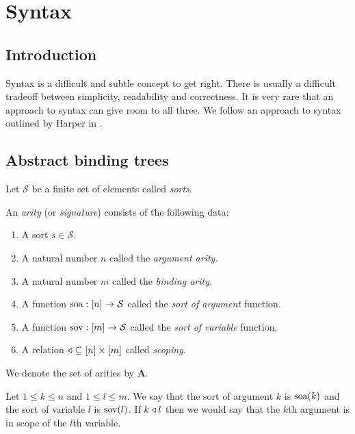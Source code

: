 \section{Syntax}

\subsection{Introduction}

Syntax is a difficult and subtle concept to get right. There is usually a difficult tradeoff between simplicity, readability and correctness. It is very rare that an approach to syntax can give room to all three. We follow an approach to syntax outlined by Harper in \cite{harper_2016}. 

\subsection{Abstract binding trees}

\begin{defin}[Sorts]
    Let $\mathcal{S}$ be a finite set of elements called \emph{sorts}.
\end{defin}

\begin{defin}[Arity]
    An \emph{arity} (or \emph{signature}) consists of the following data:
    \begin{enumerate}
        \setlength{\itemsep}{0pt}
        \item A sort $s \in \mathcal{S}$.
        \item A natural number $n$ called the \emph{argument arity}.
        \item A natural number $m$ called the \emph{binding arity}.
        \item A function $\text{soa} : [n] \to \mathcal{S}$ called the \emph{sort of argument} function.
        \item A function $\text{sov} : [m] \to \mathcal{S}$ called the \emph{sort of variable} function.
        \item A relation $\triangleleft \subseteq [n] \times [m]$ called \emph{scoping}.
    \end{enumerate}
    We denote the set of arities by $\mathbf{A}$.
\end{defin}

\begin{remark}
    Let $1 \le k \le n$ and $1 \le l \le m$. We say that the sort of argument $k$ is $\text{soa}(k)$ and the sort of variable $l$ is $\text{sov}(l)$. If $k \triangleleft l$ then we would say that the $k$th argument is in scope of the $l$th variable.
\end{remark}

